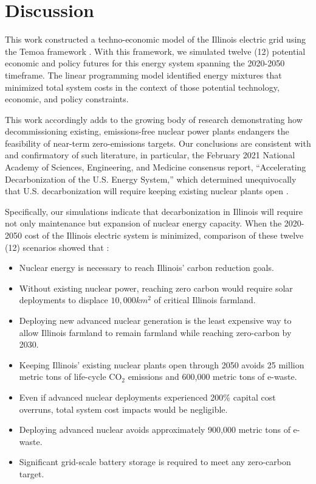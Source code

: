 \section{Discussion}\label{sec:discussion}
This work constructed a techno-economic model of the Illinois electric grid 
using the Temoa framework \cite{decarolis_modelling_2016}. With this framework, 
we simulated twelve (12) potential economic and policy futures for this energy 
system spanning the 2020-2050 timeframe. The linear programming model 
identified energy mixtures that minimized total system costs 
in the context of those potential technology, economic, and policy constraints.

This work accordingly adds to the growing body of research demonstrating how 
decommissioning existing, emissions-free nuclear power plants endangers the 
feasibility of near-term zero-emissions targets.  Our conclusions are 
consistent with and confirmatory of such literature, in particular, the 
February 2021 National Academy of Sciences, Engineering, and Medicine consensus 
report, ``Accelerating Decarbonization of the U.S. Energy System,'' which determined unequivocally that U.S. decarbonization will require keeping existing nuclear plants open
\cite{national_academies_of_sciences_engineering_and_medicine_2021_accelerating_2021}.

Specifically, our simulations indicate that decarbonization
in Illinois will require not only maintenance but expansion of nuclear energy capacity.
When the 2020-2050 cost of the Illinois electric system is minimized, 
comparison of these twelve (12) scenarios showed that :

\begin{itemize}
        \item Nuclear energy is necessary to reach Illinois' carbon reduction
                goals.
        \item Without existing nuclear power, reaching zero carbon would
                require solar deployments to displace $10,000km^2$ of critical
                Illinois
                farmland.
        \item Deploying new advanced nuclear generation is the least expensive way to
                allow Illinois farmland to remain farmland while reaching
                zero-carbon by 2030.
        \item Keeping Illinois' existing nuclear plants open through
                2050 avoids 25 million metric tons of life-cycle CO$_2$
                emissions and 600,000 metric tons of e-waste.
        \item Even if advanced nuclear deployments experienced 200\% capital
                cost overruns, total system cost impacts would be negligible.
        \item Deploying advanced nuclear avoids approximately 900,000 metric
                tons of e-waste.
        \item Significant grid-scale battery storage is required to meet any zero-carbon
                target.
\end{itemize}
